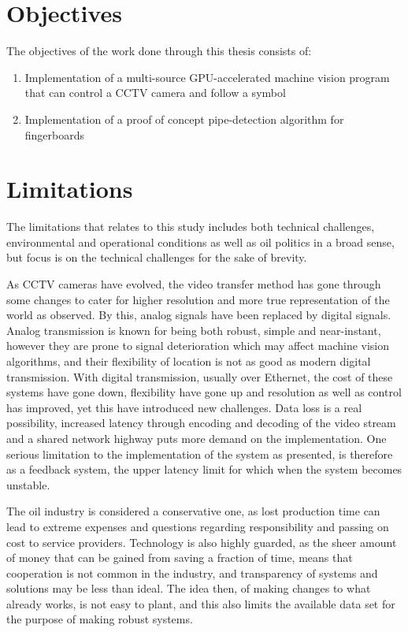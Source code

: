 \section{Objectives}
The objectives of the work done through this thesis consists of:
\begin{enumerate}
  \item Implementation of a multi-source GPU-accelerated machine vision program that can control a CCTV camera and follow a symbol
  \item Implementation of a proof of concept pipe-detection algorithm for fingerboards
\end{enumerate}

\section{Limitations}
The limitations that relates to this study includes both technical challenges, environmental and operational conditions as well as oil politics in a broad sense, but focus is on the technical challenges for the sake of brevity.

As CCTV cameras have evolved, the video transfer method has gone through some changes to cater for higher resolution and more true representation of the world as observed. By this, analog signals have been replaced by digital signals. Analog transmission is known for being both robust, simple and near-instant, however they are prone to signal deterioration which may affect machine vision algorithms, and their flexibility of location is not as good as modern digital transmission. With digital transmission, usually over Ethernet, the cost of these systems have gone down, flexibility have gone up and resolution as well as control has improved, yet this have introduced new challenges. Data loss is a real possibility, increased latency through encoding and decoding of the video stream and a shared network highway puts more demand on the implementation. One serious limitation to the implementation of the system as presented, is therefore as a feedback system, the upper latency limit for which when the system becomes unstable.

The oil industry is considered a conservative one, as lost production time can lead to extreme expenses and questions regarding responsibility and passing on cost to service providers. Technology is also highly guarded, as the sheer amount of money that can be gained from saving a fraction of time, means that cooperation is not common in the industry, and transparency of systems and solutions may be less than ideal. The idea then, of making changes to what already works, is not easy to plant, and this also limits the available data set for the purpose of making robust systems.

